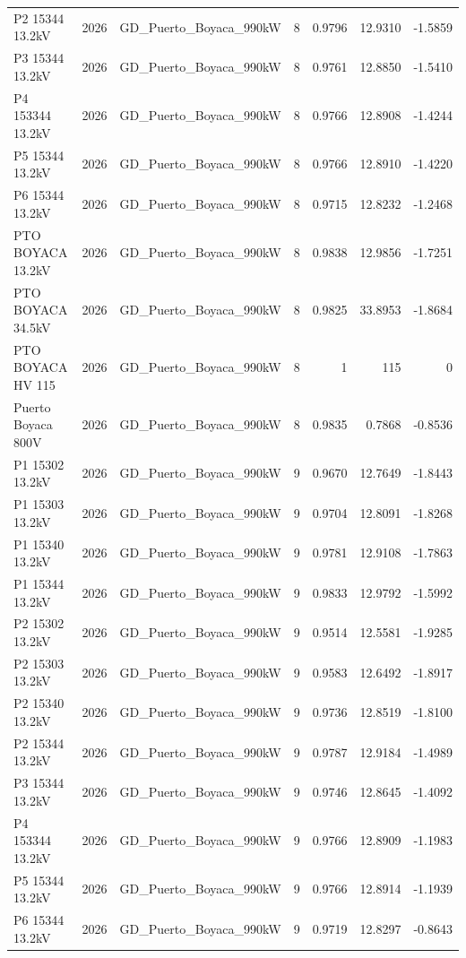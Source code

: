 \documentclass[11pt,a4paper]{article}
\begin{document}
\begin{longtable}{llllrrr}
P2 15344 13.2kV & 2026 & GD\_Puerto\_Boyaca\_990kW & 8 & 0.9796 & 12.9310 & -1.5859 \\
P3 15344 13.2kV & 2026 & GD\_Puerto\_Boyaca\_990kW & 8 & 0.9761 & 12.8850 & -1.5410 \\
P4 153344 13.2kV & 2026 & GD\_Puerto\_Boyaca\_990kW & 8 & 0.9766 & 12.8908 & -1.4244 \\
P5 15344 13.2kV & 2026 & GD\_Puerto\_Boyaca\_990kW & 8 & 0.9766 & 12.8910 & -1.4220 \\
P6 15344 13.2kV & 2026 & GD\_Puerto\_Boyaca\_990kW & 8 & 0.9715 & 12.8232 & -1.2468 \\
PTO BOYACA 13.2kV & 2026 & GD\_Puerto\_Boyaca\_990kW & 8 & 0.9838 & 12.9856 & -1.7251 \\
PTO BOYACA 34.5kV & 2026 & GD\_Puerto\_Boyaca\_990kW & 8 & 0.9825 & 33.8953 & -1.8684 \\
PTO BOYACA HV 115 & 2026 & GD\_Puerto\_Boyaca\_990kW & 8 & 1 & 115 & 0 \\
Puerto Boyaca 800V & 2026 & GD\_Puerto\_Boyaca\_990kW & 8 & 0.9835 & 0.7868 & -0.8536 \\
P1 15302 13.2kV & 2026 & GD\_Puerto\_Boyaca\_990kW & 9 & 0.9670 & 12.7649 & -1.8443 \\
P1 15303 13.2kV & 2026 & GD\_Puerto\_Boyaca\_990kW & 9 & 0.9704 & 12.8091 & -1.8268 \\
P1 15340 13.2kV & 2026 & GD\_Puerto\_Boyaca\_990kW & 9 & 0.9781 & 12.9108 & -1.7863 \\
P1 15344 13.2kV & 2026 & GD\_Puerto\_Boyaca\_990kW & 9 & 0.9833 & 12.9792 & -1.5992 \\
P2 15302 13.2kV & 2026 & GD\_Puerto\_Boyaca\_990kW & 9 & 0.9514 & 12.5581 & -1.9285 \\
P2 15303 13.2kV & 2026 & GD\_Puerto\_Boyaca\_990kW & 9 & 0.9583 & 12.6492 & -1.8917 \\
P2 15340 13.2kV & 2026 & GD\_Puerto\_Boyaca\_990kW & 9 & 0.9736 & 12.8519 & -1.8100 \\
P2 15344 13.2kV & 2026 & GD\_Puerto\_Boyaca\_990kW & 9 & 0.9787 & 12.9184 & -1.4989 \\
P3 15344 13.2kV & 2026 & GD\_Puerto\_Boyaca\_990kW & 9 & 0.9746 & 12.8645 & -1.4092 \\
P4 153344 13.2kV & 2026 & GD\_Puerto\_Boyaca\_990kW & 9 & 0.9766 & 12.8909 & -1.1983 \\
P5 15344 13.2kV & 2026 & GD\_Puerto\_Boyaca\_990kW & 9 & 0.9766 & 12.8914 & -1.1939 \\
P6 15344 13.2kV & 2026 & GD\_Puerto\_Boyaca\_990kW & 9 & 0.9719 & 12.8297 & -0.8643 \\

\end{longtable}
\end{document}
